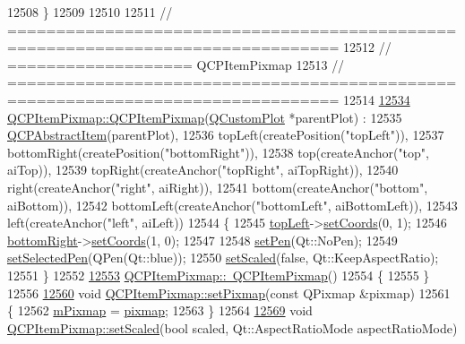 \begin{DoxyCode}
12508 \}
12509 
12510 
12511 \textcolor{comment}{// ================================================================================}
12512 \textcolor{comment}{// =================== QCPItemPixmap}
12513 \textcolor{comment}{// ================================================================================}
12514 
\hypertarget{a00115_source_l12534}{}\hyperlink{a00037_aa6de42a37261b21a5480e7da122345c3}{12534} \hyperlink{a00037_aa6de42a37261b21a5480e7da122345c3}{QCPItemPixmap::QCPItemPixmap}(\hyperlink{a00030_d8/d00/a00186}{QCustomPlot} *parentPlot) :
12535   \hyperlink{a00022}{QCPAbstractItem}(parentPlot),
12536   topLeft(createPosition(\textcolor{stringliteral}{"topLeft"})),
12537   bottomRight(createPosition(\textcolor{stringliteral}{"bottomRight"})),
12538   top(createAnchor(\textcolor{stringliteral}{"top"}, aiTop)),
12539   topRight(createAnchor(\textcolor{stringliteral}{"topRight"}, aiTopRight)),
12540   right(createAnchor(\textcolor{stringliteral}{"right"}, aiRight)),
12541   bottom(createAnchor(\textcolor{stringliteral}{"bottom"}, aiBottom)),
12542   bottomLeft(createAnchor(\textcolor{stringliteral}{"bottomLeft"}, aiBottomLeft)),
12543   left(createAnchor(\textcolor{stringliteral}{"left"}, aiLeft))
12544 \{
12545   \hyperlink{a00037_a43c281ef6ad46f3cf04f365289abe51a}{topLeft}->\hyperlink{a00038_aa988ba4e87ab684c9021017dcaba945f}{setCoords}(0, 1);
12546   \hyperlink{a00037_abcc38063f9502b876bf6615c45cc0994}{bottomRight}->\hyperlink{a00038_aa988ba4e87ab684c9021017dcaba945f}{setCoords}(1, 0);
12547   
12548   \hyperlink{a00037_acdade1305edb4b5cae14f97fd132065f}{setPen}(Qt::NoPen);
12549   \hyperlink{a00037_afc5e479e88e53740176ce77cb70dd67a}{setSelectedPen}(QPen(Qt::blue));
12550   \hyperlink{a00037_aea813ff1b12163ae5d3ac182593b1d6f}{setScaled}(\textcolor{keyword}{false}, Qt::KeepAspectRatio);
12551 \}
12552 
\hypertarget{a00115_source_l12553}{}\hyperlink{a00037_a810cac6a409d963cda6ea2d3152f1fd0}{12553} \hyperlink{a00037_a810cac6a409d963cda6ea2d3152f1fd0}{QCPItemPixmap::~QCPItemPixmap}()
12554 \{
12555 \}
12556 
\hypertarget{a00115_source_l12560}{}\hyperlink{a00037_a726b69ea4025edf48f9b29b6450548a7}{12560} \textcolor{keywordtype}{void} \hyperlink{a00037_a726b69ea4025edf48f9b29b6450548a7}{QCPItemPixmap::setPixmap}(\textcolor{keyword}{const} QPixmap &pixmap)
12561 \{
12562   \hyperlink{a00037_a1396cce7f26c7b8e9512906284380c4d}{mPixmap} = \hyperlink{a00037_a73dea89e0eb45127a2705e2c7991b8d8}{pixmap};
12563 \}
12564 
\hypertarget{a00115_source_l12569}{}\hyperlink{a00037_aea813ff1b12163ae5d3ac182593b1d6f}{12569} \textcolor{keywordtype}{void} \hyperlink{a00037_aea813ff1b12163ae5d3ac182593b1d6f}{QCPItemPixmap::setScaled}(\textcolor{keywordtype}{bool} scaled, Qt::AspectRatioMode aspectRatioMode)

\end{DoxyCode}
